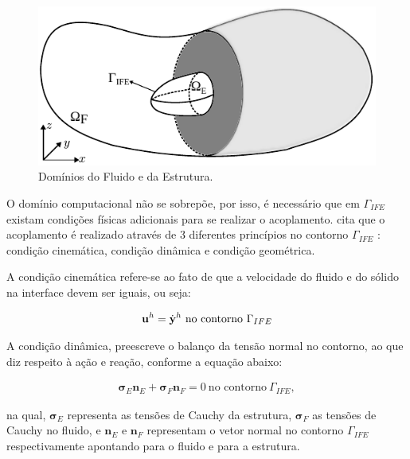 \documentclass[tese_patricia]{subfiles}
\begin{document}
\begin{figure}[htb!]
	\centering 
	\includegraphics[scale=1.0,trim=0cm 0cm 0cm 0.0cm, clip=true]{Imagens/Cap5/dominio.pdf}	
	\caption{Domínios do Fluido e da Estrutura.}
	\label{fig:dominios}
\end{figure}

O domínio computacional não se sobrepõe, por isso, é necessário que em $\Gamma_{IFE}$ existam condições físicas adicionais para se realizar o acoplamento.  cita que o acoplamento é realizado através de 3 diferentes princípios no contorno $\Gamma_{IFE}$ : condição cinemática, condição dinâmica e condição geométrica.

A condição cinemática refere-se ao fato de que a velocidade do fluido e do sólido na interface devem ser iguais, ou seja:

\begin{align}
\mathbf{u}^h = \dot{\mathbf{y}}^h \ \textrm{no contorno} \ \Gamma_{IFE}
\end{align}

A condição dinâmica, preescreve o balanço da tensão normal no contorno, ao que diz respeito à ação e reação, conforme a equação abaixo:

\begin{align}
\mathbf{\sigma}_{E}\mathbf{n}_{E} + \mathbf{\sigma}_{F}\mathbf{n}_{F} = 0 \ \textrm{no contorno} \ \Gamma_{IFE},
\end{align}

\noindent na qual, $\mathbf{\sigma}_{E}$ representa as tensões de Cauchy da estrutura, $\mathbf{\sigma}_{F}$ as tensões de Cauchy no fluido, e $\mathbf{n}_E$ e $\mathbf{n}_F$ representam o vetor normal no contorno $\Gamma_{IFE}$ respectivamente apontando para o fluido e para a estrutura.
\end{document}
